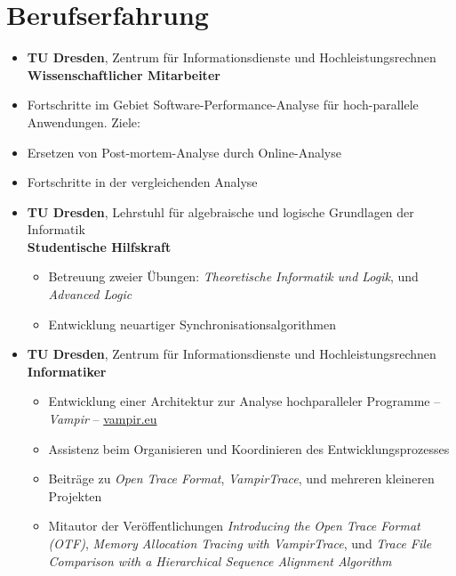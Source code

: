 \section*{Berufserfahrung}
\begin{itemize}
	\item {}
		\textbf{TU Dresden}, Zentrum f\"ur Informationsdienste und Hochleistungsrechnen \\
		\textbf{Wissenschaftlicher Mitarbeiter}
		\item Fortschritte im Gebiet Software-Performance-Analyse f\"ur hoch-parallele Anwendungen. Ziele:
			\item \hspace{2em} Ersetzen von Post-mortem-Analyse durch Online-Analyse
			\item \hspace{2em} Fortschritte in der vergleichenden Analyse
	\item {}
		\textbf{TU Dresden}, Lehrstuhl f\"ur algebraische und logische Grundlagen der Informatik \\
		\textbf{Studentische Hilfskraft}
		\begin{itemize}
			\item Betreuung zweier \"Ubungen: \textit{Theoretische Informatik und Logik}, und \textit{Advanced Logic}
			\item Entwicklung neuartiger Synchronisationsalgorithmen
		\end{itemize}
	\item {}
		\textbf{TU Dresden}, Zentrum f\"ur Informationsdienste und Hochleistungsrechnen \\
		\textbf{Informatiker}
		\begin{itemize}
			\item Entwicklung einer Architektur zur Analyse hochparalleler Programme -- \emph{Vampir} -- \href{http://www.vampir.eu}{vampir.eu}
			\item Assistenz beim Organisieren und Koordinieren des Entwicklungsprozesses
			\item Beitr\"age zu \emph{Open Trace Format}, \emph{VampirTrace}, und mehreren kleineren Projekten
			\item Mitautor der Ver\"offentlichungen \emph{Introducing the Open Trace Format (OTF)}, 
			\emph{Memory Allocation Tracing with VampirTrace}, und \emph{Trace File Comparison with a Hierarchical Sequence Alignment Algorithm}
		\end{itemize}
\end{itemize}

